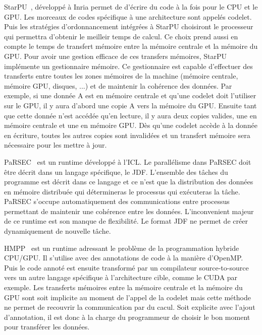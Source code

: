 StarPU~\cite{starpu}, développé à Inria permet de d'écrire du code à la fois pour le CPU et le GPU.
%
Les morceaux de codes spécifique à une architecture sont appelés codelet.
%
Puis les stratégies d'ordonnancement intégrées à StarPU choisiront le processeur qui permettra d'obtenir le meilleir temps de calcul.
%
Ce choix prend aussi en compte le temps de transfert mémoire entre la mémoire centrale et la mémoire du GPU.
%
Pour avoir une gestion efficace de ces transfers mémoires, StarPU implémente un gestionnaire mémoire.
%
Ce gestionnaire est capable d'effectuer des transferts entre toutes les zones mémoires de la machine (mémoire centrale, mémoire GPU, disques, ...) et de maintenir la cohérence des données.
%
Par exemple, si une donnée A est en mémoire centrale et qu'une codelet doit l'utiliser sur le GPU, il y aura d'abord une copie A vers la mémoire du GPU.
%
Ensuite tant que cette donnée n'est accédée qu'en lecture, il y aura deux copies valides, une en mémoire centrale et une en mémoire GPU.
%
Dès qu'une codelet accède à la donnée en écriture, toutes les autres copies sont invalidées et un transfert mémoire sera nécessaire pour les mettre à jour.


PaRSEC~\cite{PaRSEC} est un runtime développé à l'ICL.
%
Le parallélisme dans PaRSEC doit être décrit dans un langage spécifique, le JDF.
%
L'ensemble des tâches du programme est décrit dans ce langage et ce n'est que la distribution des données en mémoire distribuée qui détermineras le processus qui exécuteras la tâche.
%
PaRSEC s'occupe automatiquement des communications entre processus permettant de maintenir une cohérence entre les données.
%
L'inconvenient majeur de ce runtime est son manque de flexibilité.
%
Le format JDF ne permet de créer dynamiquement de nouvelle tâche.



HMPP~\cite{OpenACC} est un runtime adressant le problème de la programmation hybride CPU/GPU.
%
Il s'utilise avec des annotations de code à la manière d'OpenMP.
%
Puis le code annoté est ensuite transformé par un compilateur source-to-source vers un autre langage spécifique à l'architecture cible, comme le CUDA par exemple.
%
Les transferts mémoires entre la mémoire centrale et la mémoire du GPU sont soit implicite au moment de l'appel de la codelet mais cette méthode ne permet de recouvrir la communication par du cacul.
%
Soit explicite avec l'ajout d'annotation, il est donc à la charge du programmeur de choisir le bon moment pour transférer les données.



